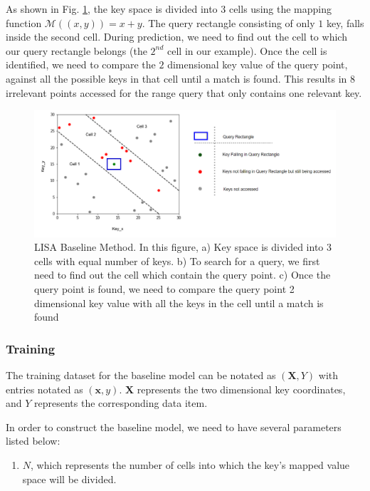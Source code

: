 \begin{mscexample}
As shown in Fig. \ref{fig:BaseLine_Method}, the key space is divided into 3 cells using the mapping function $\mathcal{M}((x,y))= x+y$. The query rectangle consisting of only $1$ key, falls inside the second cell. During prediction, we need to find out the cell to which our query rectangle belongs (the $2^{nd}$ cell in our example). Once the cell is identified, we need to compare the $2$ dimensional key value of the query point, against all the possible keys in that cell until a match is found. This results in $8$ irrelevant points accessed for the range query that only contains one relevant key.
\end{mscexample}

\begin{figure}[t]
    \centering
    \includegraphics[width=1.1\textwidth]{graphs/implementation/Baseline_limitation_new.pdf}
    \caption{LISA Baseline Method. In this figure, a) Key space is divided into 3 cells with equal number of keys. b) To search for a query, we first need to find out the cell which contain the query point. c) Once the query point is found, we need to compare the query point 2 dimensional key value with all the keys in the cell until a match is found}
    \label{fig:BaseLine_Method}
\end{figure}
\subsubsection{Training}

The training dataset for the baseline model can be notated as $(\boldsymbol{X}, Y)$ with entries notated as $(\boldsymbol{x},y)$. $\boldsymbol{X}$ represents the two dimensional key coordinates, and $Y$ represents the corresponding data item. 

In order to construct the baseline model, we need to have several parameters listed below:
\begin{enumerate}
	\item $N$, which represents the number of cells into which the key's mapped value space will be divided.
\end{enumerate}

